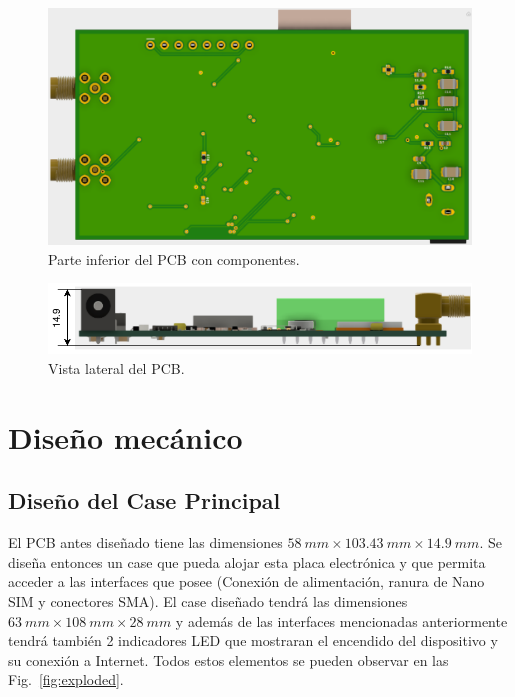 \begin{figure}[hbtp!]
\centering
\includegraphics[width=\textwidth]{board_com_bottom.png}
\caption{Parte inferior del PCB con componentes.}
\label{fig:board_bottom_con}
\end{figure}

\begin{figure}[hbtp!]
\centering
\includegraphics[width=\textwidth]{board_side_dim.pdf}
\caption{Vista lateral del PCB.}
\label{fig:board_side_con}
\end{figure}


\section{Diseño mecánico}

\subsection{Diseño del Case Principal}

El PCB antes diseñado tiene las dimensiones $\SI{58}{mm} \times \SI{103.43}{mm} \times \SI{14.9}{mm}$. Se diseña entonces un case que pueda alojar esta placa electrónica y que permita acceder a las interfaces que posee (Conexión de alimentación, ranura de Nano SIM y conectores SMA). El case diseñado tendrá las dimensiones $\SI{63}{mm} \times \SI{108}{mm} \times \SI{28}{mm}$ y además de las interfaces mencionadas anteriormente tendrá también 2 indicadores LED que mostraran el encendido del dispositivo y su conexión a Internet. Todos estos elementos se pueden observar en las Fig.~\ref{fig:exploded}.

